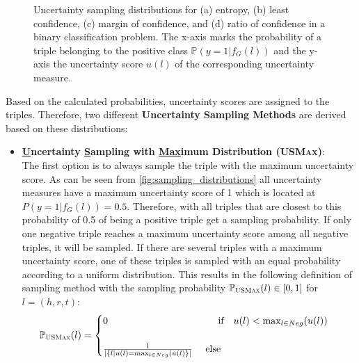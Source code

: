 \begin{figure}[H]
\begin{minipage}{.4\textwidth}
    \end{minipage}%
    \caption{Uncertainty sampling distributions for (a) entropy, (b) least confidence, (c) margin of confidence, and (d) ratio of confidence in a binary classification problem.
    The x-axis marks the probability of a triple belonging to the positive class $\mathbb{P}(y = 1 | f_G(l))$ and the y-axis the uncertainty score $u(l)$ of the corresponding uncertainty measure.}
    \label{fig:sampling_distributions}
\end{figure}

Based on the calculated probabilities, uncertainty scores are assigned to the triples.
Therefore, two different \textbf{Uncertainty Sampling Methods} are derived based on these distributions:
\begin{itemize}
    \item 
    \textbf{\underline{U}ncertainty \underline{S}ampling with \underline{Max}imum Distribution (\textsc{USMax})}:\\
    The first option is to always sample the triple with the maximum uncertainty score.
    As can be seen from \autoref{fig:sampling_distributions} all uncertainty measures have a maximum uncertainty score of 1 which is located at $P(y = 1 | f_G(l)) = 0.5$.
    Therefore, with \usmax all triples that are closest to this probability of 0.5 of being a positive triple get a sampling probability.
    If only one negative triple reaches a maximum uncertainty score among all negative triples, it will be sampled.
    If there are several triples with a maximum uncertainty score, one of these triples is sampled with an equal probability according to a uniform distribution.
    This results in the following definition of sampling method \usmax with the  sampling probability $\mathbb{P}_{\textsc{USMax}}(l) \in [0,1]$ for $l = (h,r,t)$:
    \begin{equation} 
        \mathbb{P}_{\usmax}(l) =
        \begin{cases}
             0 \ \ \ \ \ \ \ \ \ \ \ \ \ \  \ \ \ \ \ \ \ \ \ \ \ \ \ \ \ \ \ \ \ \ 
             \text{if}\ \ \ u(l) < \max_{l \in Neg}(u(l)) 
             \\ \\
            \frac{1}{|\{l | u(l) = \max_{l \in Neg}(u(l)\}|} 
            \ \ \ \
            \text{else} 
             \\
        \end{cases}
         \label{eq:usmax}
    \end{equation}
    

\end{itemize}
